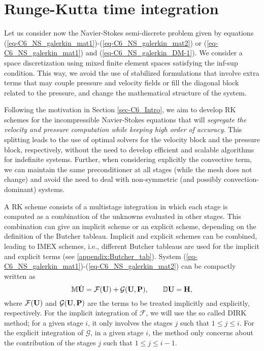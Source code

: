 \section{Runge-Kutta time integration}
\label{sec-C6_Half-IMEX-RK_NSI}
Let us consider now the Navier-Stokes semi-discrete problem given by equations (\ref{eq-C6_NS_galerkin_mat1})-(\ref{eq-C6_NS_galerkin_mat2}) or  (\ref{eq-C6_NS_galerkin_mat1})        and  (\ref{eq-C6_NS_galerkin_DM-1}). We consider a space discretization using mixed finite element spaces satisfying the inf-sup condition. This way, we avoid the use of stabilized formulations that involve extra terms that may couple pressure and velocity fields or fill the diagonal block related to the pressure, and change the mathematical structure of the system.

Following the motivation in Section \ref{sec-C6_Intro}, we aim to develop RK schemes for the incompressible Navier-Stokes equations that will \emph{segregate the velocity and pressure computation while keeping high order of accuracy}. This splitting leads to the use of optimal solvers for the velocity block and the pressure block, respectively, without the need to develop efficient and scalable algorithms for indefinite systems. Further, when considering explicitly the convective term, we can maintain the same preconditioner at all stages (while the mesh does not change) and avoid the need to deal with non-symmetric (and possibly convection-dominant) systems. 

A RK scheme consists of a multistage integration in which each stage is computed as a combination of the unknowns evaluated in other stages. This combination can give an implicit scheme or an explicit scheme, depending on the definition of the Butcher tableau. Implicit and explicit schemes can be combined, leading to IMEX schemes, i.e., different Butcher tableaus are used for the implicit and explicit terms (see \ref{appendix:Butcher_tab}). System (\ref{eq-C6_NS_galerkin_mat1})-(\ref{eq-C6_NS_galerkin_mat2}) can be compactly written as
\begin{equation}
\label{eq-C6_NS_galerkin_mat1_ope}
\mathbb{M}\dot{{\bf U}}=\mathcal{F}({\bf U})+\mathcal{G}({\bf U},{\bf P}), \qquad \mathbb{D} {\bf U} = \bf{H},
\end{equation}
where $\mathcal{F}({\bf U})$  and $\mathcal{G}({\bf U},{\bf P})$ are the terms to be treated implicitly and explicitly, respectively. 
For the implicit integration of $\mathcal{F}$, we will use the so called DIRK method; for a given stage $i$, it only involves the stages $j$ such that $1\leq j\leq i$. For the explicit integration of $\mathcal{G}$, in a given stage $i$, the method only concerns about the contribution of the stages $j$ such that $1\leq j\leq i-1$. 


